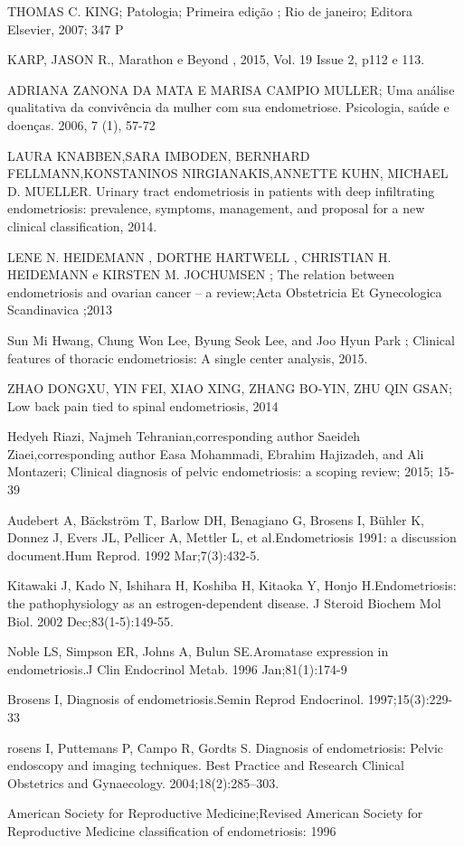 \documentclass[12pt]{article} %
\begin{document}
THOMAS C. KING; Patologia; Primeira edição ; Rio de janeiro; Editora Elsevier, 2007; 347 P

KARP, JASON R., Marathon e Beyond , 2015, Vol. 19 Issue 2, p112 e 113.

ADRIANA ZANONA DA MATA E MARISA CAMPIO MULLER; Uma análise qualitativa da convivência da mulher com sua endometriose. Psicologia, saúde e doenças. 2006, 7 (1), 57-72

LAURA KNABBEN,SARA IMBODEN, BERNHARD FELLMANN,KONSTANINOS NIRGIANAKIS,ANNETTE KUHN, MICHAEL D. MUELLER. Urinary tract endometriosis in patients with deep infiltrating endometriosis: prevalence, symptoms, management, and proposal for a new clinical classification, 2014.

LENE N. HEIDEMANN , DORTHE HARTWELL , CHRISTIAN H. HEIDEMANN e KIRSTEN M.
JOCHUMSEN ; The relation between endometriosis and ovarian cancer – a
review;Acta Obstetricia Et Gynecologica Scandinavica ;2013

Sun Mi Hwang, Chung Won Lee, Byung Seok Lee, and Joo Hyun Park ; Clinical features of thoracic endometriosis: A single center analysis, 2015.

ZHAO DONGXU, YIN FEI, XIAO XING, ZHANG BO-YIN, ZHU QIN GSAN; Low back pain tied to spinal endometriosis, 2014


Hedyeh Riazi, Najmeh Tehranian,corresponding author Saeideh Ziaei,corresponding author Easa Mohammadi, Ebrahim Hajizadeh, and Ali Montazeri; Clinical diagnosis of pelvic endometriosis: a scoping review; 2015; 15-39

Audebert A, Bäckström T, Barlow DH, Benagiano G, Brosens I, Bühler K, Donnez J, Evers JL, Pellicer A, Mettler L, et al.Endometriosis 1991: a discussion document.Hum Reprod. 1992 Mar;7(3):432-5.

Kitawaki J, Kado N, Ishihara H, Koshiba H, Kitaoka Y, Honjo H.Endometriosis: the pathophysiology as an estrogen-dependent disease. J Steroid Biochem Mol Biol. 2002 Dec;83(1-5):149-55.

Noble LS, Simpson ER, Johns A, Bulun SE.Aromatase expression in endometriosis.J Clin Endocrinol Metab. 1996 Jan;81(1):174-9

Brosens I, Diagnosis of endometriosis.Semin Reprod Endocrinol. 1997;15(3):229-33

rosens I, Puttemans P, Campo R, Gordts S. Diagnosis of endometriosis: Pelvic endoscopy and imaging techniques. Best Practice and Research Clinical Obstetrics and Gynaecology. 2004;18(2):285–303.

American Society for Reproductive Medicine;Revised American Society for Reproductive Medicine classification of endometriosis: 1996
\end{document}
